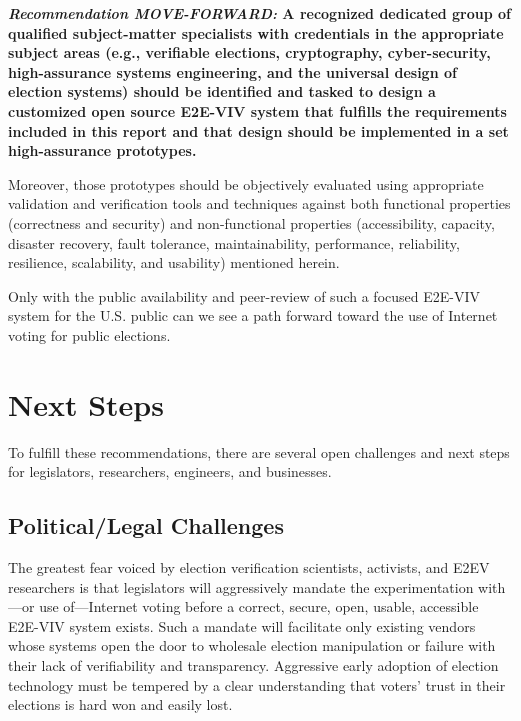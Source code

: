 \begin{center}
  \textbf{\emph{Recommendation MOVE-FORWARD:} A recognized dedicated
    group of qualified subject-matter specialists with credentials in
    the appropriate subject areas (e.g., verifiable elections,
    cryptography, cyber-security, high-assurance systems engineering,
    and the universal design of election systems) should be identified
    and tasked to design a customized open source E2E-VIV system that
    fulfills the requirements included in this report and that design
    should be implemented in a set high-assurance prototypes.}
\end{center}

Moreover, those prototypes should be objectively evaluated using
appropriate validation and verification tools and techniques against
both functional properties (correctness and security) and
non-functional properties (accessibility, capacity, disaster recovery,
fault tolerance, maintainability, performance, reliability,
resilience, scalability, and usability) mentioned herein.

Only with the public availability and peer-review of such a focused
E2E-VIV system for the U.S. public can we see a path forward
toward the use of Internet voting for public elections.

\section{Next Steps}
\label{sec:next-steps}

To fulfill these recommendations, there are several open challenges
and next steps for legislators, researchers, engineers, and
businesses.

\subsection{Political/Legal Challenges}

The greatest fear voiced by election verification scientists,
activists, and E2EV researchers is that legislators will aggressively
mandate the experimentation with---or use of---Internet voting before
a correct, secure, open, usable, accessible E2E-VIV system
exists. Such a mandate will facilitate only existing vendors whose
systems open the door to wholesale election manipulation or failure
with their lack of verifiability and transparency. Aggressive early
adoption of election technology must be tempered by a clear
understanding that voters' trust in their elections is hard won and
easily lost.

